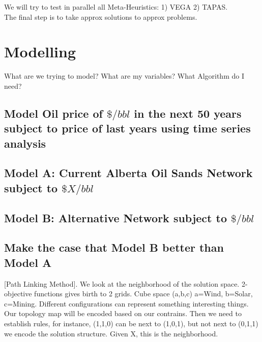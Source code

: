 \documentclass[12pt]{article}
\begin{document}
We will try to test in parallel all Meta-Heuristics: 1) VEGA 2) TAPAS. \\

The final step is to take approx solutions to approx problems. \\

\section{Modelling}

What are we trying to model? What are my variables? What Algorithm do I need?
\subsection{Model Oil price of $\$/bbl$ in the next 50 years subject to price of last years using time series analysis}
\subsection{Model A: Current Alberta Oil Sands Network subject to $\$X/bbl$}
\subsection{Model B: Alternative Network subject to $\$/bbl$}
\subsection{Make the case that Model B better than Model A}

[Path Linking Method]. We look at the neighborhood of the solution space. 2-objective functions gives birth to 2 grids. Cube space (a,b,c) a=Wind, b=Solar, c=Mining. Different configurations can represent something interesting things. Our topology map will be encoded based on our contrains. Then we need to establish rules, for instance, (1,1,0) can be next to (1,0,1), but not next to (0,1,1) we encode the solution structure. Given X, this is the neighborhood.  

\end{document}
